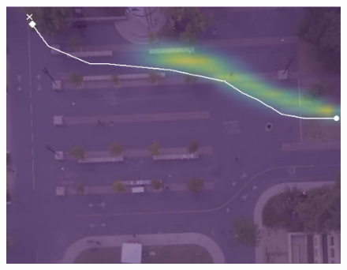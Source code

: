 \documentclass[letterpaper,10pt,conference]{ieeeconf}
\begin{document}
\begin{figure}
\begin{minipage}[c]{0.3\linewidth}
		\includegraphics[width=\linewidth]{./figures/bookstore/kit_1_2_t=370.jpg}
	\end{minipage}
	

\end{figure}
\end{document}

